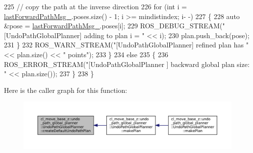 \begin{DoxyCode}
225                 \textcolor{comment}{// copy the path at the inverse direction}
226                 \textcolor{keywordflow}{for} (\textcolor{keywordtype}{int} i = \hyperlink{classcl__move__base__z_1_1undo__path__global__planner_1_1UndoPathGlobalPlanner_a9a4a6e40f5b6cb5f77dedbc5b6170871}{lastForwardPathMsg\_}.poses.size() - 1; i >= mindistindex; i-
      -)
227                 \{
228                     \textcolor{keyword}{auto} &pose = \hyperlink{classcl__move__base__z_1_1undo__path__global__planner_1_1UndoPathGlobalPlanner_a9a4a6e40f5b6cb5f77dedbc5b6170871}{lastForwardPathMsg\_}.poses[i];
229                     ROS\_DEBUG\_STREAM(\textcolor{stringliteral}{"[UndoPathGlobalPlanner] adding to plan i = "} << i);
230                     plan.push\_back(pose);
231                 \}
232                 ROS\_WARN\_STREAM(\textcolor{stringliteral}{"[UndoPathGlobalPlanner] refined plan has "} << plan.size() << \textcolor{stringliteral}{"  points"});
233             \}
234             \textcolor{keywordflow}{else}
235             \{
236                 ROS\_ERROR\_STREAM(\textcolor{stringliteral}{"[UndoPathGlobalPlanner ] backward global plan size:  "} << plan.size());
237             \}
238         \}
\end{DoxyCode}
Here is the caller graph for this function\+:
\nopagebreak
\begin{figure}[H]
\begin{center}
\leavevmode
\includegraphics[width=350pt]{classcl__move__base__z_1_1undo__path__global__planner_1_1UndoPathGlobalPlanner_a659c16f439d33ac7026a54bb65c26ca8_icgraph}
\end{center}
\end{figure}
\mbox{\label{classcl__move__base__z_1_1undo__path__global__planner_1_1UndoPathGlobalPlanner_a69e0fbb98872f108f679b2a6620638f5}} 
